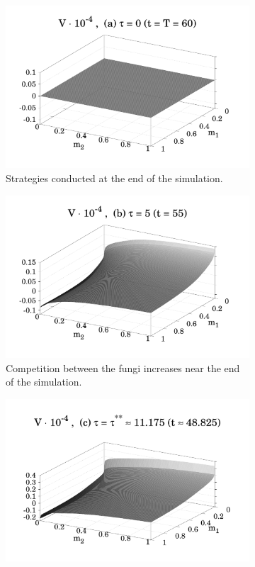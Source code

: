 \documentclass[11pt]{amsart}
\begin{document}
\begin{figure}
    \begin{subfigure}{.48 \textwidth}
        \includegraphics[width = \textwidth]{figures/Figure_4a.pdf}
        \caption{Strategies conducted at the end of the simulation.}
        \label{fig_4_a}
    \end{subfigure}
    \hfill
    \begin{subfigure}{.48 \textwidth}
        \includegraphics[width = \textwidth]{figures/Figure_4b_1.pdf}
        \caption{Competition between the fungi increases near the end of the simulation.}
        \label{fig_4_b}
    \end{subfigure}
    \hfill
    \begin{subfigure}{.48 \textwidth}
        \includegraphics[width = \textwidth]{figures/Figure_4c_1.pdf}

\end{subfigure}
\end{figure}
\end{document}
